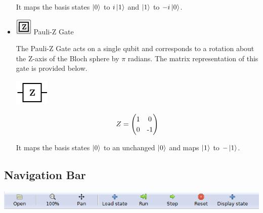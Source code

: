 \documentclass[10pt]{article}
\theoremstyle{definition}
\newcommand{\microspace}{\mspace{0.5mu}}
\def \lket {\left|}
\def \rket {\right\rangle}
\newcommand{\ket}[1]{\lket\microspace #1 \microspace\rket}
\begin{document}
\begin{itemize}
It maps the basis states $\ket{0}$ to $i\ket{1}$ and $\ket{1}$ to $-i\ket{0}$. 

\item \includegraphics{Figures/Gates/ZGate.png}  Pauli-Z Gate

The Pauli-Z Gate acts on a single qubit and corresponds to a rotation about the Z-axis of the Bloch sphere by $\pi$ radians. The matrix representation of this gate is provided below.

\begin{center}
\includegraphics[scale=.7]{Figures/Gates/ZGateViewer} \\
  \vspace*{3pt}
  \begin{minipage}{.9\linewidth}
    \begin{equation*} \label{mat:ZGate}
    \renewcommand{\arraystretch}{1.25}
Z = \begin{pmatrix} 1 & 0 \\ 0 & \textnormal{-}1 \end{pmatrix}
    \end{equation*}
  \end{minipage}\hspace{-2.5cm}
\end{center}

It maps the basis states $\ket{0}$ to an unchanged $\ket{0}$ and maps $\ket{1}$ to $-\ket{1}$. 

\end{itemize}

\subsection{Navigation Bar}\label{sub:NavigationBar}

\begin{center}
\includegraphics{Figures/Navigation/NavigationBar.png}
\end{center}
\end{document}
